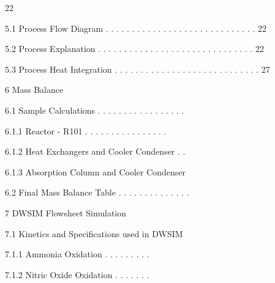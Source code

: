 \documentclass[a4paper,portrait,12pt]{article}
\begin{document}
22


\begin{flushleft}
5.1 Process Flow Diagram . . . . . . . . . . . . . . . . . . . . . . . . . . . . . 22
\end{flushleft}


\begin{flushleft}
5.2 Process Explanation . . . . . . . . . . . . . . . . . . . . . . . . . . . . . . 22
\end{flushleft}


\begin{flushleft}
5.3 Process Heat Integration . . . . . . . . . . . . . . . . . . . . . . . . . . . . 27
\end{flushleft}


\begin{flushleft}
6 Mass Balance
\end{flushleft}


\begin{flushleft}
6.1 Sample Calculations . . . . . . . . . . . . . . . . .
\end{flushleft}


\begin{flushleft}
6.1.1 Reactor - R101 . . . . . . . . . . . . . . . .
\end{flushleft}


\begin{flushleft}
6.1.2 Heat Exchangers and Cooler Condenser . .
\end{flushleft}


\begin{flushleft}
6.1.3 Absorption Column and Cooler Condenser
\end{flushleft}


\begin{flushleft}
6.2 Final Mass Balance Table . . . . . . . . . . . . . .
\end{flushleft}


\begin{flushleft}
7 DWSIM Flowsheet Simulation
\end{flushleft}


\begin{flushleft}
7.1 Kinetics and Specifications used in DWSIM
\end{flushleft}


\begin{flushleft}
7.1.1 Ammonia Oxidation . . . . . . . . .
\end{flushleft}


\begin{flushleft}
7.1.2 Nitric Oxide Oxidation . . . . . . .
\end{flushleft}
\end{document}
